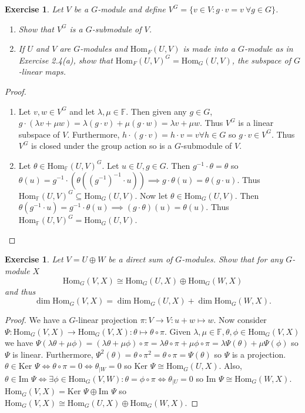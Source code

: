 \documentclass{article}
\newtheorem{exercise}[theorem]{Exercise}
\begin{document}
\begin{exercise}
     Let \( V \) be a \( G \)-module and define \( V^G = \{ v \in V : g \cdot v = v \ \forall g \in G \} \).
    \begin{enumerate}
        \item[(a)] Show that \( V^G \) is a \( G \)-submodule of \( V \).
        \item[(b)] If \( U \) and \( V \) are \( G \)-modules and \( \mathrm{Hom}_F(U, V) \) is made into a \( G \)-module as in Exercise 2.4(a), show that \( \mathrm{Hom}_F(U, V)^G = \mathrm{Hom}_G(U, V) \), the subspace of \( G \)-linear maps.
    \end{enumerate}
\end{exercise}
\begin{proof}
\begin{enumerate}
    \item[(a)] Let $v,w\in V^G$ and let $\lambda,\mu\in\mathbb{F}$. Then given any $g\in G$, $g\cdot(\lambda v+\mu w)=\lambda(g\cdot v)+\mu(g\cdot w)=\lambda v+\mu w$. Thus $V^G$ is a linear subspace of $V$. Furthermore, $h\cdot(g\cdot v)=h\cdot v=v\forall h\in G$ so $g\cdot v\in V^G$. Thus $V^G$ is closed under the group action so is a $G$-submodule of $V$.
    \item[(b)] Let $\theta\in\text{Hom}_{\mathbb{F}}(U,V)^G$. Let $u\in U,g\in G$. Then $g^{-1}\cdot\theta=\theta$ so $\theta(u)=g^{-1}\cdot(\theta((g^{-1})^{-1}\cdot u))\implies g\cdot\theta(u)=\theta(g\cdot u)$. Thus $\text{Hom}_{\mathbb{F}}(U,V)^G\subseteq \text{Hom}_G(U,V)$. Now let $\theta\in\text{Hom}_G(U,V)$. Then $\theta(g^{-1}\cdot u)=g^{-1}\cdot\theta(u)\implies (g\cdot\theta)(u)=\theta(u)$. Thus $\text{Hom}_{\mathbb{F}}(U,V)^G= \text{Hom}_G(U,V)$.
\end{enumerate}
\end{proof}


\begin{exercise}
     Let \( V = U \oplus W \) be a direct sum of \( G \)-modules. Show that for any \( G \)-module \( X \)
    \[
    \mathrm{Hom}_G(V, X) \cong \mathrm{Hom}_G(U, X) \oplus \mathrm{Hom}_G(W, X)
    \]
    and thus
    \[
    \dim \mathrm{Hom}_G(V, X) = \dim \mathrm{Hom}_G(U, X) + \dim \mathrm{Hom}_G(W, X).
    \]
\end{exercise}
\begin{proof}
We have a $G$-linear projection $\pi:V\to V:u+w\mapsto w$. Now consider $\Psi:\text{Hom}_G(V,X)\to \text{Hom}_G(V,X):\theta\mapsto\theta\circ\pi$. Given $\lambda,\mu\in\mathbb{F},\theta,\phi\in\text{Hom}_G(V,X)$ we have $\Psi(\lambda\theta+\mu\phi)=(\lambda\theta+\mu\phi)\circ\pi=\lambda\theta\circ\pi+\mu\phi\circ\pi=\lambda\Psi(\theta)+\mu\Psi(\phi)$ so $\Psi$ is linear. Furthermore, $\Psi^2(\theta)=\theta\circ\pi^2=\theta\circ\pi=\Psi(\theta)$ so $\Psi$ is a projection. $\theta\in\text{Ker }\Psi\iff\theta\circ\pi=0\iff\theta_{|W}=0$ so $\text{Ker }\Psi\cong\text{Hom}_G(U,X)$. Also, $\theta\in\text{Im }\Psi\iff\exists\phi\in\text{Hom}_G(V,W):\theta=\phi\circ\pi\iff \theta_{|U}=0$ so $\text{Im }\Psi\cong\text{Hom}_G(W,X)$. $\text{Hom}_G(V,X)=\text{Ker }\Psi\oplus\text{Im }\Psi$ so $\text{Hom}_G(V,X)\cong\text{Hom}_G(U,X)\oplus\text{Hom}_G(W,X)$.
\end{proof}
\end{document}
